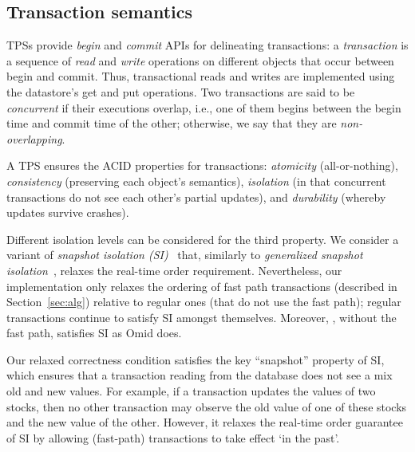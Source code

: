 \noindent
{

\subsection{Transaction semantics} \label{ssec:transactions}

TPSs provide \emph{begin} and \emph{commit} APIs for delineating transactions: 
a \emph{transaction} is a sequence of \emph{read} and \emph{write} operations on different objects 
that occur between begin and commit. {}
Thus, transactional reads and writes are implemented using the 
datastore's get and put operations.
Two transactions are said to be \emph{concurrent} if 
their executions overlap, i.e., one of them begins between the begin time and commit time of the other;
otherwise, we say that they are \emph{non-overlapping}.

A TPS  ensures the ACID properties for transactions:
\emph{atomicity} (all-or-nothing), \emph{consistency} (preserving each object's semantics), 
\emph{isolation} (in that concurrent transactions do not see each other's partial updates), and 
\emph{durability} (whereby updates survive crashes).

Different isolation levels can be considered for the third property. We consider a variant of 
\emph{snapshot isolation (SI)}~\cite{DBLP:conf/sigmod/BerensonBGMOO95} that, similarly to \emph{generalized snapshot isolation}~\cite{DBLP:conf/srds/ElniketyZP05}, relaxes  the real-time order requirement. 
Nevertheless, our implementation only relaxes the ordering of fast path  transactions (described in Section~\ref{sec:alg}) 
relative to regular ones (that do not use the fast path); regular transactions continue to satisfy SI amongst themselves. 
Moreover, \sysll, without the fast path, satisfies SI as Omid does.

Our relaxed correctness condition satisfies the key ``snapshot'' property of SI, which ensures that a transaction reading from the  database
does not see a mix old and new values. For example, if a transaction updates the values of two stocks, 
then no other transaction may observe the old value of one of these stocks and the new value of the other.
However, it relaxes the real-time order guarantee of SI by allowing (fast-path) transactions to take effect `in the past'.  
 }
